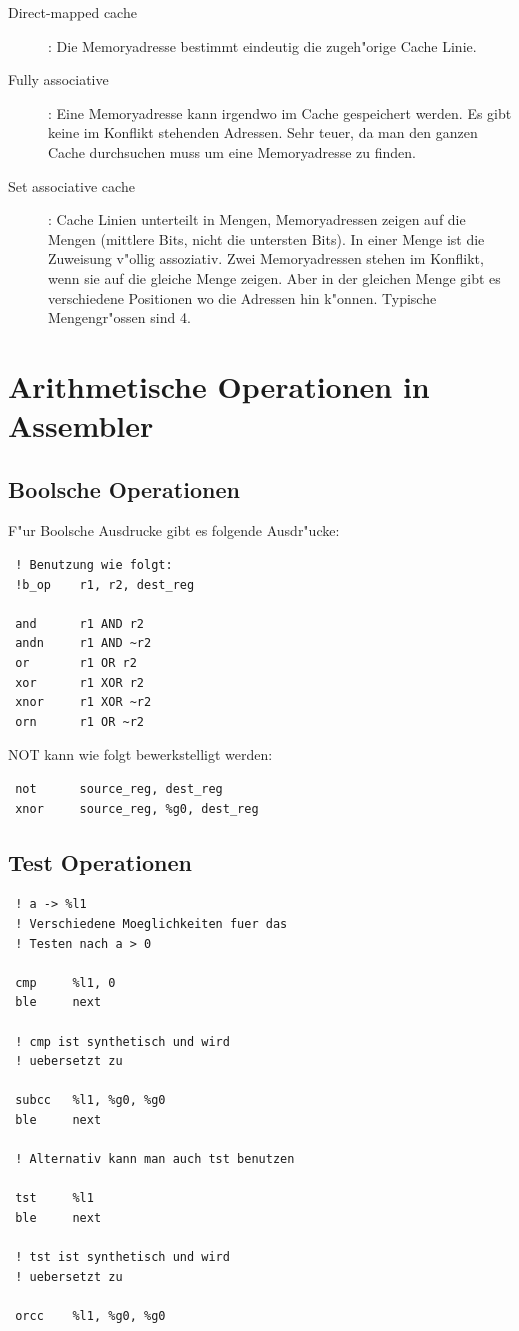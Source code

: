 \documentclass[german, 10pt, a4paper, twocolumn]{scrartcl}
\begin{document}
\begin{description}
	\item[Direct-mapped cache]: Die Memoryadresse bestimmt eindeutig die zugeh"orige Cache Linie.
	\item[Fully associative]: Eine Memoryadresse kann irgendwo im Cache gespeichert werden. Es gibt keine im Konflikt stehenden Adressen. Sehr teuer, da man den ganzen Cache durchsuchen muss um eine Memoryadresse zu finden.
	\item[Set associative cache]: Cache Linien unterteilt in Mengen, Memoryadressen zeigen auf die Mengen (mittlere Bits, nicht die untersten Bits). In einer Menge ist die Zuweisung v"ollig assoziativ. Zwei Memoryadressen stehen im Konflikt, wenn sie auf die gleiche Menge zeigen. Aber in der gleichen Menge gibt es verschiedene Positionen wo die Adressen hin k"onnen. Typische Mengengr"ossen sind 4.
\end{description}


\section{Arithmetische Operationen in Assembler}

\subsection{Boolsche Operationen}

F"ur Boolsche Ausdrucke gibt es folgende Ausdr"ucke:
\begin{verbatim}
 ! Benutzung wie folgt:
 !b_op    r1, r2, dest_reg

 and      r1 AND r2
 andn     r1 AND ~r2
 or       r1 OR r2
 xor      r1 XOR r2
 xnor     r1 XOR ~r2
 orn      r1 OR ~r2
\end{verbatim}

NOT kann wie folgt bewerkstelligt werden:
\begin{verbatim}
 not      source_reg, dest_reg
 xnor     source_reg, %g0, dest_reg
\end{verbatim}

\subsection{Test Operationen}

\begin{verbatim}
 ! a -> %l1
 ! Verschiedene Moeglichkeiten fuer das 
 ! Testen nach a > 0
 
 cmp     %l1, 0
 ble     next
 
 ! cmp ist synthetisch und wird
 ! uebersetzt zu

 subcc   %l1, %g0, %g0
 ble     next
 
 ! Alternativ kann man auch tst benutzen
 
 tst     %l1
 ble     next

 ! tst ist synthetisch und wird
 ! uebersetzt zu

 orcc    %l1, %g0, %g0
\end{verbatim}
\end{document}
